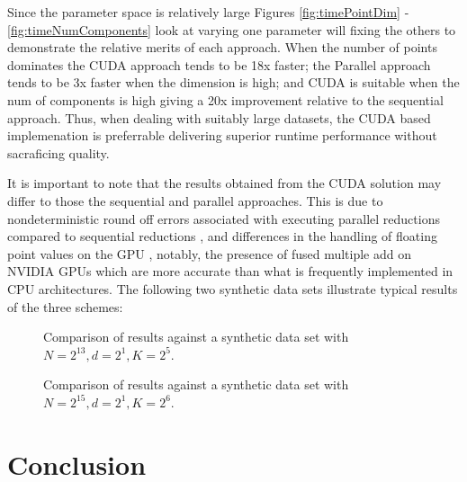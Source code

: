 \documentclass{article}
\begin{document}
Since the parameter space is relatively large Figures \ref{fig:timePointDim} - \ref{fig:timeNumComponents} look at varying one parameter will fixing the others to demonstrate the relative merits of each approach. When the number of points dominates the CUDA approach tends to be 18x faster; the Parallel approach tends to be 3x faster when the dimension is high; and CUDA is suitable when the num of components is high giving a 20x improvement relative to the sequential approach. Thus, when dealing with suitably large datasets, the CUDA based implemenation is preferrable delivering superior runtime performance without sacraficing quality.

It is important to note that the results obtained from the CUDA solution may differ to those the sequential and parallel approaches. This is due to nondeterministic round off errors associated with executing parallel reductions compared to sequential reductions \cite{collange2015numerical}, and differences in the handling of floating point values on the GPU \cite{whitehead2011precision}, notably, the presence of fused multiple add on NVIDIA GPUs which are more accurate than what is frequently implemented in CPU architectures. The following two synthetic data sets illustrate typical results of the three schemes:

\begin{figure}[H]
	\caption{Comparison of results against a synthetic data set with $N = 2^{13}, d = 2^{1}, K = 2^{5}$.}
\end{figure}

\begin{figure}[H]
	\caption{Comparison of results against a synthetic data set with $N = 2^{15}, d = 2^{1}, K = 2^{6}$.}
\end{figure}

\section{Conclusion}



\end{document}
